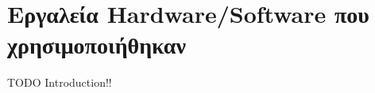 \chapter{Εργαλεία Hardware/Software που χρησιμοποιήθηκαν}
\label{chapter:tools}

TODO Introduction!!




